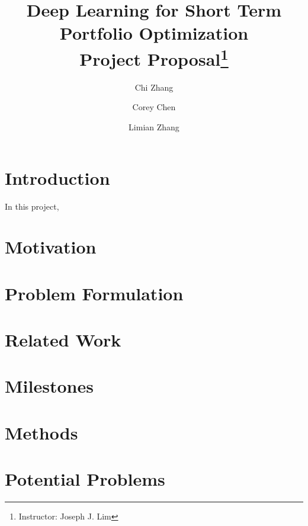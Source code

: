 \documentclass[a4paper, 11pt]{article}
\title{\textbf{Deep Learning for Short Term Portfolio Optimization}\\Project Proposal\thanks{Instructor: Joseph J. Lim}}
\author[]{Chi Zhang}
\author[]{Corey Chen}
\author[]{Limian Zhang}
\affil[]{Department of Computer Science}
\begin{document}
  \maketitle                     %
  \begin{spacing}{1}
    
    \section{Introduction}
    In this project, 
    
    \section{Motivation}
    
    \section{Problem Formulation}
    
    
    \section{Related Work}
    
    \section{Milestones}
    
    \section{Methods}
    
    \section{Potential Problems} 
  
  \end{spacing}  
  
  
\end{document}
